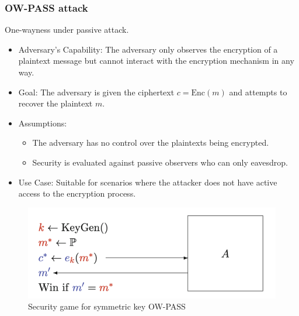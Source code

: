 \subsubsection{OW-PASS attack}
One-wayness under passive attack.
\begin{itemize}
    \item Adversary's Capability: The adversary only observes the encryption of a plaintext message but cannot interact with the encryption mechanism in any way.
    \item Goal: The adversary is given the ciphertext \( c = \text{Enc}(m) \) and attempts to recover the plaintext \( m \).
    \item Assumptions:
    \begin{itemize}
        \item The adversary has no control over the plaintexts being encrypted.
        \item Security is evaluated against passive observers who can only eavesdrop.
    \end{itemize}
    \item Use Case: Suitable for scenarios where the attacker does not have active access to the encryption process.
\end{itemize}

\begin{figure}[h!]
    \centering
    \includegraphics[scale=0.5]{img/OWpass.png}
    \caption{Security game for symmetric key OW-PASS}
\end{figure}


